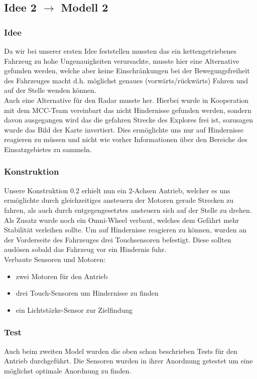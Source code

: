 \documentclass[10pt,a4paper]{scrartcl}
\begin{document}
\subsection{Idee 2 $\rightarrow$ Modell 2}%
\subsubsection{Idee}
Da wir bei unserer ersten Idee feststellen mussten das ein kettengetriebenes Fahrzeug zu hohe Ungenauigkeiten verursachte, musste hier eine Alternative gefunden werden, welche aber keine Einschränkungen bei der Bewegungsfreiheit des Fahrzeuges macht d.h. möglichst genaues (vorwärts/rückwärts) Fahren und auf der Stelle wenden können.\\
Auch eine Alternative für den Radar musste her. Hierbei wurde in Kooperation mit dem MCC-Team vereinbart das nicht Hindernisse gefunden werden, sondern davon ausgegangen wird das die gefahren Strecke des Explores frei ist, sozusagen wurde das Bild der Karte invertiert. Dies ermöglichte uns nur auf Hindernisse reagieren zu müssen und nicht wie vorher Informationen über den Bereiche des Einsatzgebietes zu sammeln.
\subsubsection{Konstruktion}
Unsere Konstruktion 0.2 erhielt nun ein 2-Achsen Antrieb, welcher es uns ermöglichte durch gleichzeitiges ansteuern der Motoren gerade Strecken zu fahren, als auch durch entgegengesetztes ansteuern sich auf der Stelle zu drehen. Als Zusatz wurde noch ein Omni-Wheel verbaut, welches dem Gefährt mehr Stabilität verleihen sollte. Um auf Hindernisse reagieren zu können, wurden an der Vorderseite des Fahrzeuges drei Touchsensoren befestigt. Diese sollten auslösen sobald das Fahrzeug vor ein Hindernis fuhr.\\
Verbaute Sensoren und Motoren:
\begin{itemize}
\item zwei Motoren für den Antrieb
\item drei Touch-Sensoren um Hindernisse zu finden
\item ein Lichtstärke-Sensor zur Zielfindung
\end{itemize}
\subsubsection{Test}
Auch beim zweiten Model wurden die oben schon beschrieben Tests für den Antrieb durchgeführt. Die Sensoren wurden in ihrer Anordnung getestet um eine möglichst optimale Anordnung zu finden. 
\end{document}
